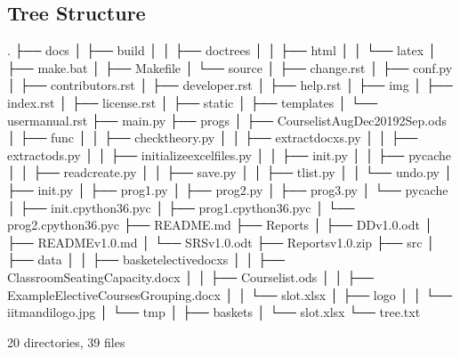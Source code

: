 \documentclass[letterpaper,10pt,english]{sphinxmanual}
\begin{document}
\subsection{Tree Structure}
\label{\detokenize{developer:tree-structure}}
\begin{sphinxVerbatim}[commandchars=\\\{\}]
.
├── docs
│   ├── build
│   │   ├── doctrees
│   │   ├── html
│   │   └── latex
│   ├── make.bat
│   ├── Makefile
│   └── source
│       ├── change.rst
│       ├── conf.py
│       ├── contributors.rst
│       ├── developer.rst
│       ├── help.rst
│       ├── img
│       ├── index.rst
│       ├── license.rst
│       ├── \PYGZus{}static
│       ├── \PYGZus{}templates
│       └── user\PYGZus{}manual.rst
├── main.py
├── progs
│   ├── CourselistAug\PYGZhy{}Dec2019\PYGZus{}2Sep.ods
│   ├── func
│   │   ├── checktheory.py
│   │   ├── extract\PYGZus{}docxs.py
│   │   ├── extract\PYGZus{}ods.py
│   │   ├── initialize\PYGZus{}excel\PYGZus{}files.py
│   │   ├── \PYGZus{}\PYGZus{}init\PYGZus{}\PYGZus{}.py
│   │   ├── \PYGZus{}\PYGZus{}pycache\PYGZus{}\PYGZus{}
│   │   ├── read\PYGZus{}create.py
│   │   ├── save.py
│   │   ├── tlist.py
│   │   └── undo.py
│   ├── \PYGZus{}\PYGZus{}init\PYGZus{}\PYGZus{}.py
│   ├── prog1.py
│   ├── prog2.py
│   ├── prog3.py
│   └── \PYGZus{}\PYGZus{}pycache\PYGZus{}\PYGZus{}
│       ├── \PYGZus{}\PYGZus{}init\PYGZus{}\PYGZus{}.cpython\PYGZhy{}36.pyc
│       ├── prog1.cpython\PYGZhy{}36.pyc
│       └── prog2.cpython\PYGZhy{}36.pyc
├── README.md
├── Reports
│   ├── DD\PYGZus{}v1.0.odt
│   ├── README\PYGZus{}v1.0.md
│   └── SRS\PYGZus{}v1.0.odt
├── Reports\PYGZus{}v1.0.zip
├── src
│   ├── data
│   │   ├── basket\PYGZus{}elective\PYGZus{}docxs
│   │   ├── ClassroomSeatingCapacity.docx
│   │   ├── Courselist.ods
│   │   ├── ExampleElectiveCoursesGrouping.docx
│   │   └── slot.xlsx
│   ├── logo
│   │   └── iitmandilogo.jpg
│   └── tmp
│       ├── baskets
│       └── slot.xlsx
└── tree.txt


20 directories, 39 files
\end{sphinxVerbatim}
\end{document}
